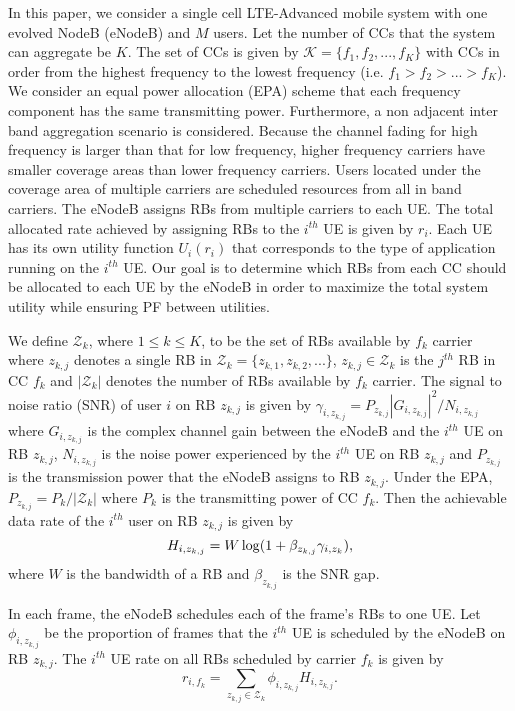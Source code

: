 \documentclass[conference]{IEEEtran}
\begin{document}
In this paper, we consider a single cell LTE-Advanced mobile system with one evolved NodeB (eNodeB) and $M$ users. Let the number of CCs that the system can aggregate be $K$. The set of CCs is given by $\mathcal{K}=\{f_1,f_2,...,f_K\}$  with CCs in order from the highest frequency to the lowest frequency (i.e. $f_1> f_2>...>f_K$). We consider an equal power allocation (EPA) scheme that each frequency component has the same transmitting power. Furthermore, a non adjacent inter band aggregation scenario is considered. Because the channel fading for high frequency is larger than that for low frequency, higher frequency carriers have smaller coverage areas than lower frequency carriers. Users located under the coverage area of multiple carriers are scheduled resources from all in band carriers. The eNodeB assigns RBs from multiple carriers to each UE. The total allocated rate achieved by assigning RBs to the $i^{th}$ UE is given by $r_i$. Each UE has its own utility function $U_i(r_i)$  that corresponds to the type of application running on the $i^{th}$  UE. Our goal is to determine which RBs from each CC should be allocated to each UE by the eNodeB in order to maximize the total system utility while ensuring PF between utilities.

We define $\mathcal{Z}_k$, where $1\leq k \leq K$, to be the set of RBs available by $f_k$ carrier where $z_{k,j}$ denotes a single RB in $\mathcal{Z}_k=\{z_{k,1},z_{k,2},...\}$, $z_{k,j} \in \mathcal{Z}_k$ is the $j^{th}$ RB in CC $f_k$ and $|\mathcal{Z}_k|$ denotes the number of RBs available by $f_k$ carrier. The signal to noise ratio (SNR) of user $i$ on RB $z_{k,j}$ is given by $\gamma_{i,z_{k,j}} = P_{z_{k,j}} |G_{i,z_{k,j}}|^2 / N_{i,z_{k,j}}$
where $G_{i,z_{k,j}}$ is the complex channel gain between the eNodeB and the $i^{th}$ UE on RB $z_{k,j}$, $N_{i,z_{k,j}}$ is the noise power experienced by the $i^{th}$ UE on RB $z_{k,j}$ and $P_{z_{k,j}}$ is the transmission power that the eNodeB assigns to RB $z_{k,j}$. Under the EPA, $P_{z_{k,j}}=P_k/|\mathcal{Z}_k|$ where $P_k$ is the transmitting power of CC $f_k$. Then the achievable data rate of the $i^{th}$ user on RB $z_{k,j}$ is given by
\vspace{-0.7em}
\begin{equation}\label{eqn:datrate on z_{k,j}}
H_{i,z_{k,j}} = W \log(1+\beta_{z_{k,j}} \gamma_{i,z_k}),
\end{equation}
where $W$ is the bandwidth of a RB and $\beta_{z_{k,j}}$ is the SNR gap.

In each frame, the eNodeB schedules each of the frame's RBs to one UE. Let $\phi_{i,z_{k,j}}$ be the proportion of frames that the $i^{th}$ UE is scheduled by the eNodeB on RB $z_{k,j}$. The $i^{th}$ UE rate on all RBs scheduled by carrier $f_k$ is given by
\begin{equation}\label{eqn:rate by f_k}
r_{i,f_k} = \sum_{z_{k,j}\in \mathcal{Z}_k}\phi_{i,z_{k,j}} H_{i,z_{k,j}}.
\end{equation}
\end{document}
